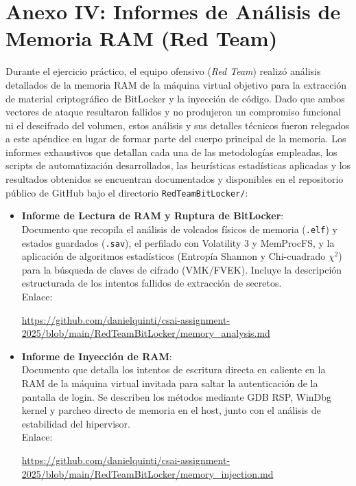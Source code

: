 \chapter[Anexo IV: Informes de Análisis de Memoria RAM]{Anexo IV: Informes de Análisis de Memoria RAM (Red Team)}
\label{chap:anexo_analisis_memoria}

Durante el ejercicio práctico, el equipo ofensivo (\textit{Red Team}) realizó análisis detallados de la memoria RAM de la máquina virtual objetivo para la extracción de material criptográfico de BitLocker y la inyección de código. Dado que ambos vectores de ataque resultaron fallidos y no produjeron un compromiso funcional ni el descifrado del volumen, estos análisis y sus detalles técnicos fueron relegados a este apéndice en lugar de formar parte del cuerpo principal de la memoria. Los informes exhaustivos que detallan cada una de las metodologías empleadas, los scripts de automatización desarrollados, las heurísticas estadísticas aplicadas y los resultados obtenidos se encuentran documentados y disponibles en el repositorio público de GitHub bajo el directorio \texttt{RedTeamBitLocker/}:


\begin{itemize}
    \item \textbf{Informe de Lectura de RAM y Ruptura de BitLocker}: \\
    Documento que recopila el análisis de volcados físicos de memoria (\texttt{.elf}) y estados guardados (\texttt{.sav}), el perfilado con Volatility 3 y MemProcFS, y la aplicación de algoritmos estadísticos (Entropía Shannon y Chi-cuadrado $\chi^2$) para la búsqueda de claves de cifrado (VMK/FVEK). Incluye la descripción estructurada de los intentos fallidos de extracción de secretos. \\
    Enlace:
    \begin{center}
        \scriptsize\url{https://github.com/danielquinti/csai-assignment-2025/blob/main/RedTeamBitLocker/memory_analysis.md}
    \end{center}
    
    \item \textbf{Informe de Inyección de RAM}: \\
    Documento que detalla los intentos de escritura directa en caliente en la RAM de la máquina virtual invitada para saltar la autenticación de la pantalla de login. Se describen los métodos mediante GDB RSP, WinDbg kernel y parcheo directo de memoria en el host, junto con el análisis de estabilidad del hipervisor. \\
    Enlace:
    \begin{center}
        \scriptsize\url{https://github.com/danielquinti/csai-assignment-2025/blob/main/RedTeamBitLocker/memory_injection.md}
    \end{center}
\end{itemize}
